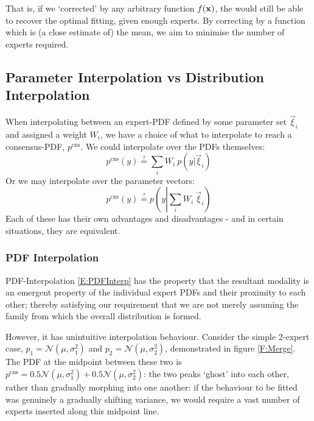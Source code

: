 	That is, if we `corrected' by any arbitrary function $f(\mathbf{\boldsymbol{\mathrm{x}}})$, the \fade{} would still be able to recover the optimal fitting, given enough experts. By correcting by a function which is (a close estimate of) the mean, we aim to minimise the number of experts required.


\subsection{Parameter Interpolation vs Distribution Interpolation}

	When interpolating between an expert-PDF defined by some parameter set $\vec{\xi}_i$ and assigned a weight $W_i$, we have a choice of what to interpolate to reach a consensus-PDF, $p^\text{cns}$. We could interpolate over the PDFs themselves:
	\begin{equation}
		p^\text{cns}(y) \stackrel{?}{=} \sum_i W_i ~ p(y | \vec{\xi}_i) \label{E:PDFInterp}
	\end{equation}
	Or we may interpolate over the parameter vectors:
	\begin{equation}
		p^\text{cns}(y) \stackrel{?}{=} p\left(y \left| \sum_i W_i ~\vec{\xi}_i\right.\right) \label{E:ParamInterp}
	\end{equation}
	Each of these has their own advantages and disadvantages - and in certain situations, they are equivalent.

	\subsubsection{PDF Interpolation}

		PDF-Interpolation \eqref{E:PDFInterp} has the property that the resultant modality is an emergent property of the individual expert PDFs and their proximity to each other; thereby satisfying our requirement that we are not merely assuming the family from which the overall distribution is formed.

		However, it has unintuitive interpolation behaviour. Consider the simple 2-expert case, $p_1 = \mathcal{N}(\mu, \sigma_1^2)$ and $p_2 = \mathcal{N}(\mu,\sigma_2^2)$, demonstrated in figure \ref{F:Merge}. The PDF at the midpoint between these two is $p^\text{cns} = 0.5 \mathcal{N}(\mu, \sigma_1^2) + 0.5 \mathcal{N}(\mu,\sigma_2^2)$: the two peaks `ghost' into each other, rather than gradually morphing into one another: if the behaviour to be fitted was genuinely a gradually shifting variance, we would require a vast number of experts inserted along this midpoint line.

